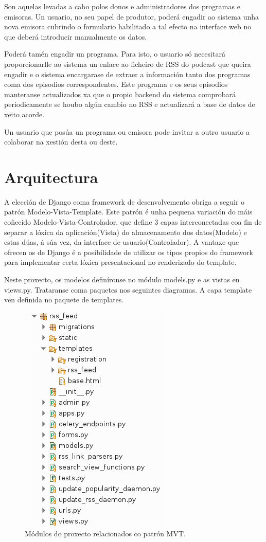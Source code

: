 Son aquelas levadas a cabo polos donos e administradores dos programas e emisoras. Un usuario, no seu papel de produtor, poderá engadir ao sistema unha nova emisora cubrindo o formulario habilitado a tal efecto na interface web no que deberá introducir manualmente os datos.

Poderá tamén engadir un programa. Para isto, o usuario só necesitará proporcionarlle ao sistema un enlace ao ficheiro de RSS do podcast que queira engadir e o sistema encargarase de extraer a información tanto dos programas coma dos episodios correspondentes. Este programa e os seus episodios manteranse actualizados xa que o propio backend do sistema comprobará periodicamente se houbo algún cambio no RSS e actualizará a base de datos de xeito acorde.  

Un usuario que posúa un programa ou emisora pode invitar a outro usuario a colaborar na xestión desta ou deste.

\section{Arquitectura}

A elección de Django coma framework de desenvolvemento obriga a seguir o patrón Modelo-Vista-Template. Este patrón é unha pequena variación do máis coñecido Modelo-Vista-Controlador, que define 3 capas interconectadas coa fin de separar a lóxica da aplicación(Vista) do almacenamento dos datos(Modelo) e estas dúas, á súa vez, da interface de usuario(Controlador). A vantaxe que ofrecen os  de Django é a posibilidade de utilizar os tipos propios do framework para implementar certa lóxica presentacional no renderizado do template.

Neste proxecto, os modelos  definíronse no módulo models.py e as vistas en views.py. Trataranse coma paquetes nos seguintes diagramas. A capa template ven definida no paquete de templates.

\begin{figure}[h]
	\centering
	\includegraphics[scale=0.5,keepaspectratio=true]{./images/project_tree.png}
	\caption{Módulos do proxecto relacionados co patrón MVT.}
	\label{fig:project_tree}
\end{figure}


